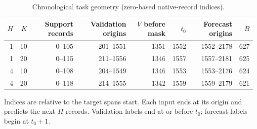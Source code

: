\begin{table}[pos=!htbp]
\centering\footnotesize
\caption{Chronological task geometry (zero-based native-record indices).}\label{tab:s-windows}
\begin{tabular}{rrrrrrrr}
\toprule
$H$ & $K$ & Support records & Validation origins & $V$ before mask & $t_0$ & Forecast origins & $B$\\\midrule
1 & 10 & 0--105 & 201--1551 & 1351 & 1552 & 1552--2178 & 627\\
1 & 20 & 0--115 & 211--1556 & 1346 & 1557 & 1557--2181 & 625\\
4 & 10 & 0--108 & 204--1549 & 1346 & 1553 & 1553--2176 & 624\\
4 & 20 & 0--118 & 214--1555 & 1342 & 1559 & 1559--2179 & 621\\
\bottomrule
\end{tabular}
\par\vspace{3pt}\begin{minipage}{\linewidth}\footnotesize Indices are relative to the target span\textquotesingle s start. Each input ends at its origin and predicts the next $H$ records. Validation labels end at or before $t_0$; forecast labels begin at $t_0+1$.\end{minipage}
\end{table}
